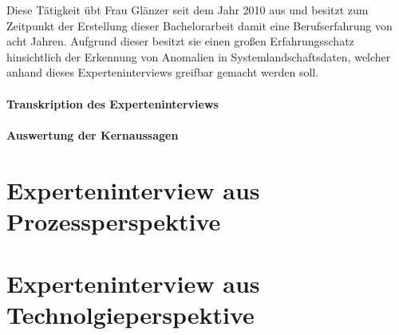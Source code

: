 Diese Tätigkeit übt Frau Glänzer seit dem Jahr 2010 aus und besitzt zum Zeitpunkt der Erstellung dieser Bachelorarbeit damit eine Berufserfahrung von acht Jahren. Aufgrund dieser besitzt sie einen großen Erfahrungsschatz hinsichtlich der Erkennung von Anomalien in Systemlandschaftsdaten, welcher anhand dieses Experteninterviews greifbar gemacht werden soll.

\paragraph{Transkription des Experteninterviews}
\paragraph{Auswertung der Kernaussagen}


\section{Experteninterview aus Prozessperspektive}

\section{Experteninterview aus Technolgieperspektive}
